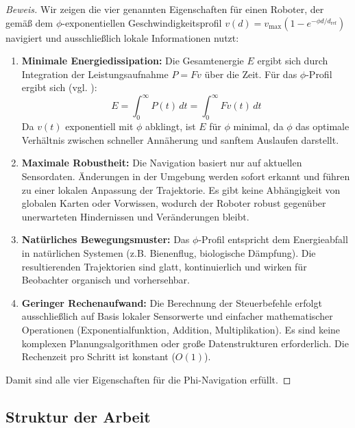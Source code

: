 ﻿\documentclass[a4paper,12pt]{article}
\theoremstyle{definition}
\begin{document}
\begin{proof}[Beweis]
	Wir zeigen die vier genannten Eigenschaften für einen Roboter, der gemäß dem $\phi$-exponentiellen Geschwindigkeitsprofil $v(d) = v_{\max}(1 - e^{-\phi d/d_{\text{ref}}})$ navigiert und ausschließlich lokale Informationen nutzt:
	\begin{enumerate}
		\item \textbf{Minimale Energiedissipation:} Die Gesamtenergie $E$ ergibt sich durch Integration der Leistungsaufnahme $P = Fv$ über die Zeit. Für das $\phi$-Profil ergibt sich (vgl. \cite{phi_energy}):
		\[
		E = \int_0^\infty P(t)\,dt = \int_0^\infty F v(t)\,dt
		\]
		Da $v(t)$ exponentiell mit $\phi$ abklingt, ist $E$ für $\phi$ minimal, da $\phi$ das optimale Verhältnis zwischen schneller Annäherung und sanftem Auslaufen darstellt.
		\item \textbf{Maximale Robustheit:} Die Navigation basiert nur auf aktuellen Sensordaten. Änderungen in der Umgebung werden sofort erkannt und führen zu einer lokalen Anpassung der Trajektorie. Es gibt keine Abhängigkeit von globalen Karten oder Vorwissen, wodurch der Roboter robust gegenüber unerwarteten Hindernissen und Veränderungen bleibt.
		\item \textbf{Natürliches Bewegungsmuster:} Das $\phi$-Profil entspricht dem Energieabfall in natürlichen Systemen (z.B. Bienenflug, biologische Dämpfung). Die resultierenden Trajektorien sind glatt, kontinuierlich und wirken für Beobachter organisch und vorhersehbar.
		\item \textbf{Geringer Rechenaufwand:} Die Berechnung der Steuerbefehle erfolgt ausschließlich auf Basis lokaler Sensorwerte und einfacher mathematischer Operationen (Exponentialfunktion, Addition, Multiplikation). Es sind keine komplexen Planungsalgorithmen oder große Datenstrukturen erforderlich. Die Rechenzeit pro Schritt ist konstant ($O(1)$).
	\end{enumerate}
	Damit sind alle vier Eigenschaften für die Phi-Navigation erfüllt.
\end{proof}

\subsection{Struktur der Arbeit}
\end{document}
